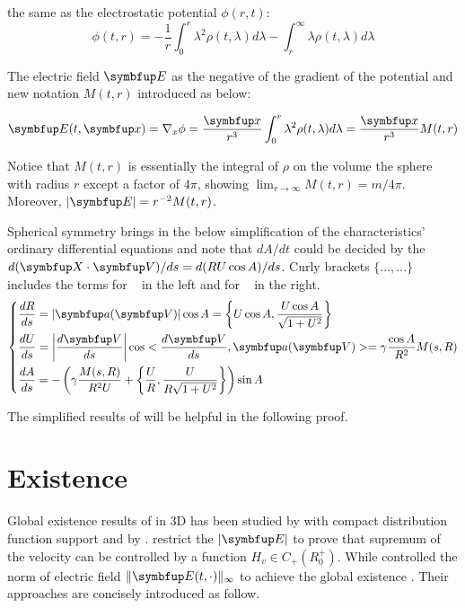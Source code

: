  the same as the electrostatic potential $\phi(r,t)$: 
\begin{equation}
    \phi(t, r)=-\frac{1}{r} \int_{0}^{r} \lambda^{2} \rho(t, \lambda) d \lambda-\int_{r}^{\infty} \lambda \rho(t, \lambda) d \lambda
\end{equation}
 
The electric field $\vE$ as the negative of the gradient of the potential and new notation $M(t, r)$ introduced as below:

\begin{equation}\vE( t,\vx)=\nabla_{x} \phi=\frac{\vx}{r^{3}} \int_{0}^{r} \lambda^{2} \rho(t, \lambda) d \lambda = \frac{\vx}{r^3} M(t, r)\end{equation}

Notice that $M(t, r)$ is essentially the integral of $\rho$ on the volume the sphere with radius $r$ except a factor of $4\pi$, showing $\lim_{r\rightarrow \infty} M(t, r)= m/4\pi$. Moreover, $|\vE|=r^{-2}M(t,r)$.

Spherical symmetry brings in the below simplification of the characteristics' ordinary differential equations and note that $dA/dt$ could be decided by the $d(\vect{X}\cdot \vect{V})/ds = d(RU\cos A)/ds$. Curly brackets $\{... ,...\}$ includes the terms for \eqvp~ in the left and for \eqrvp~ in the right. 
\begin{equation}\left\{\begin{aligned}
    &\frac{d R}{d s}=|\vect{a}(\vect{V})|\cos A =\left\{ U \cos A,  \frac{U \cos A}{\sqrt{1+U^{2}}} \right\}  \\
    &\frac{d U}{d s}=\left| \frac{d\vect{V}}{ds} \right| \cos<\frac{d\vect{V}}{ds}, \vect{a}(\vect{V})>=\gamma \frac{\cos A}{R^{2}} M(s, R) \\
    &\frac{d A}{d s}=-\left(\gamma \frac{M(s, R)}{R^{2} U}+ \left\{\frac{U}{R},   \frac{U}{R \sqrt{1+U^{2}}} \right\}  \right) \sin A
\end{aligned}\right.\end{equation}

The simplified results of \eqrvp will be helpful in the following proof.

\section{Existence}
Global existence results of \eqrvp in 3D has been studied by \cite{glassey_symmetric_1985} with compact distribution function support and by \cite{wang2003global}. \cite{glassey_symmetric_1985} restrict the $|\vE|$  to prove that supremum of the velocity can be controlled by a function $H_v \in C_{+}(R_0^+)$. While \cite{wang2003global} controlled the norm of electric field $\|\vE(t, \cdot)\|_{\infty}$ to achieve the global existence . Their approaches are concisely introduced as follow.


